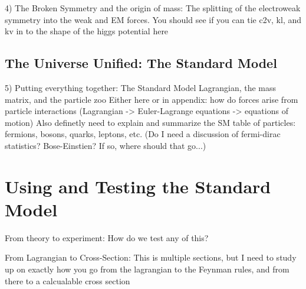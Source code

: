     4) The Broken Symmetry and the origin of mass:
        The splitting of the electroweak symmetry into the weak and EM forces. You should see if you can tie c2v, kl, and kv in to the shape of the higgs potential here

    \subsection{The Universe Unified: The Standard Model}

    5) Putting everything together: The Standard Model Lagrangian, the mass matrix, and the particle zoo
        Either here or in appendix: how do forces arise from particle interactions (Lagrangian -> Euler-Lagrange equations -> equations of motion)
        Also definetly need to explain and summarize the SM table of particles: fermions, bosons, quarks, leptons, etc.
        (Do I need a discussion of fermi-dirac statistics? Bose-Einstien? If so, where should that go...)


\section{Using and Testing the Standard Model}

    From theory to experiment: How do we test any of this?
        
    From Lagrangian to Cross-Section:
        This is multiple sections, but I need to study up on exactly how you go from the lagrangian to the Feynman rules, and from there to a calcualable cross section



